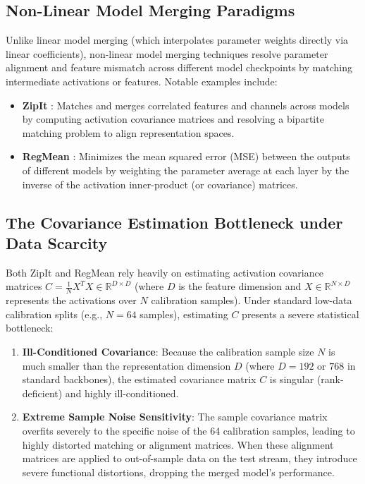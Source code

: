 \documentclass{article}
\theoremstyle{plain}
\theoremstyle{definition}
\theoremstyle{remark}
\begin{document}
\subsection{Non-Linear Model Merging Paradigms}
Unlike linear model merging (which interpolates parameter weights directly via linear coefficients), non-linear model merging techniques resolve parameter alignment and feature mismatch across different model checkpoints by matching intermediate activations or features. Notable examples include:
\begin{itemize}
    \item \textbf{ZipIt} \cite{stoica2023zip}: Matches and merges correlated features and channels across models by computing activation covariance matrices and resolving a bipartite matching problem to align representation spaces.
    \item \textbf{RegMean} \cite{jin2022dataless}: Minimizes the mean squared error (MSE) between the outputs of different models by weighting the parameter average at each layer by the inverse of the activation inner-product (or covariance) matrices.
\end{itemize}

\subsection{The Covariance Estimation Bottleneck under Data Scarcity}
Both ZipIt and RegMean rely heavily on estimating activation covariance matrices $C = \frac{1}{N} X^T X \in \mathbb{R}^{D \times D}$ (where $D$ is the feature dimension and $X \in \mathbb{R}^{N \times D}$ represents the activations over $N$ calibration samples). Under standard low-data calibration splits (e.g., $N=64$ samples), estimating $C$ presents a severe statistical bottleneck:
\begin{enumerate}
    \item \textbf{Ill-Conditioned Covariance}: Because the calibration sample size $N$ is much smaller than the representation dimension $D$ (where $D = 192$ or $768$ in standard backbones), the estimated covariance matrix $C$ is singular (rank-deficient) and highly ill-conditioned.
    \item \textbf{Extreme Sample Noise Sensitivity}: The sample covariance matrix overfits severely to the specific noise of the 64 calibration samples, leading to highly distorted matching or alignment matrices. When these alignment matrices are applied to out-of-sample data on the test stream, they introduce severe functional distortions, dropping the merged model's performance.
\end{enumerate}
\end{document}
